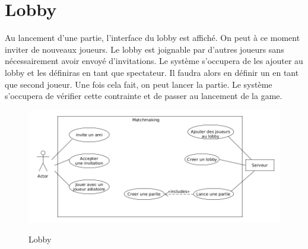 \documentclass[../besoin_sys.tex]{subfiles}
\begin{document}
\section{Lobby}

Au lancement d'une partie, l'interface du lobby est affiché. On peut à ce moment inviter de nouveaux joueurs. 
Le lobby est joignable par d'autres joueurs sans nécessairement avoir envoyé d'invitations.
Le système s'occupera de les ajouter au lobby et les définiras en tant que spectateur.
Il faudra alors en définir un en tant que second joueur. Une fois cela fait, on peut lancer la partie.
Le système s'occupera de vérifier cette contrainte et de passer au lancement de la game.

\begin{figure}[h]
    \centering
    \includegraphics[scale=0.6]{img_fonctionnel/usecas_sys_matchmaking.png}
    \label{fig:Lobby}
    \caption{Lobby}
\end{figure}
\end{document}
